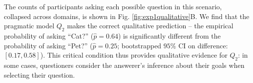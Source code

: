 \documentclass[12pt, floatsintext, jou]{apa6}
\begin{document}
%

The counts of participants asking each possible question in this scenario, collapsed across domains, is shown in Fig. \ref{fig:exp1qualitative}B. 
We find that the pragmatic model $Q_2$ makes the correct qualitative prediction -- the empirical probability of asking ``Cat?'' ($\hat{p} = 0.64$) is significantly different from the  probability of asking ``Pet?'' ($\hat{p} = 0.25$; bootstrapped $95\%$ CI on difference: $[0.17, 0.58]$). 
This critical condition thus provides qualitative evidence for $Q_2$: in some cases, questioners consider the answerer's inference about their goals when selecting their question. 

%

\end{document}
